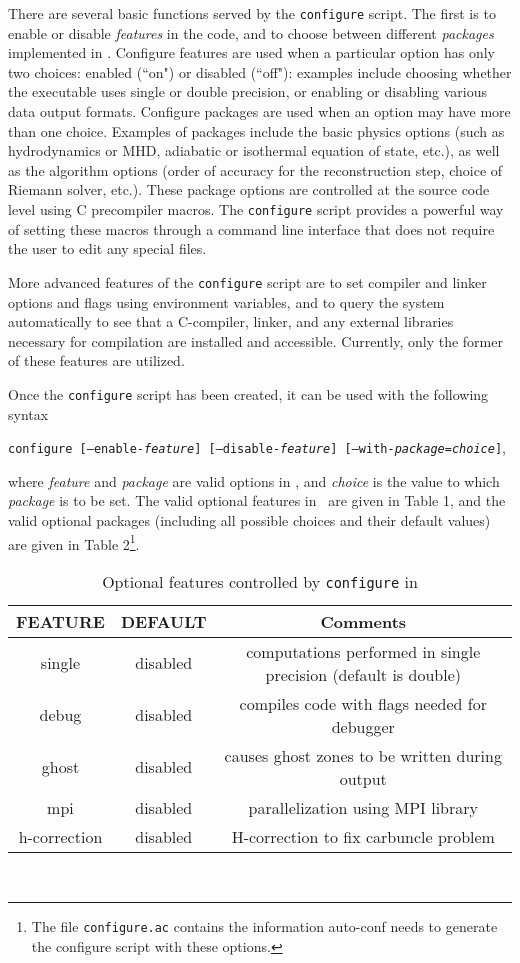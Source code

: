 There are several basic functions served by the {\tt configure} script.
The first is to enable or disable {\it features} in the code, and to
choose between different {\it packages} implemented in \ath.  Configure
features are used when a particular option has only two choices:
enabled (``on") or disabled (``off"): examples include choosing whether
the executable uses single or double precision, or enabling or disabling
various data output formats.  Configure packages are used when an
option may have more than one choice.  Examples of packages include
the basic physics options (such as hydrodynamics or MHD, adiabatic or
isothermal equation of state, etc.), as well as the algorithm options
(order of accuracy for the reconstruction step, choice of Riemann solver,
etc.).  These package options are controlled at the source code
level using C precompiler macros.  The {\tt configure} script provides
a powerful way of setting these macros through a command line interface
that does not require the user to edit any special files.

More advanced features of the {\tt configure} script are to set compiler
and linker options and flags using environment variables, and to query the
system automatically to see that a C-compiler, linker, and any external
libraries necessary for compilation are installed and accessible.
Currently, only the former of these features are utilized.

Once the {\tt configure} script has been created, it can be used
with the following
syntax
\begin{center}
{\tt configure [--enable-{\it feature}] [--disable-{\it feature}]
[--with-{\it package}={\it choice}]},
\end{center}
where {\it feature} and {\it package}
are valid options in \ath, and {\it choice} is the value to which
{\it package} is to be set.  The valid optional features in \ath\ are given in
Table 1, and the valid optional packages (including all possible choices and
their default values) are given in Table 2\footnote{The file {\tt configure.ac}
contains the information auto-conf needs to generate the configure script
with these options.}.

\begin{table}[ht]
\caption{Optional features controlled by {\tt configure} in \ath}
\begin{center}
\begin{tabular}{|c|c|c|} \hline \hline
FEATURE & DEFAULT & Comments \\ \hline
single &  disabled & computations performed in single precision (default is double) \\
debug  & disabled & compiles code with flags needed for debugger \\
ghost  & disabled & causes ghost zones to be written during output \\
mpi    & disabled & parallelization using MPI library \\
h-correction & disabled & H-correction to fix carbuncle problem 
\\ \hline
\end{tabular}
\end{center}
\\
\end{table}

